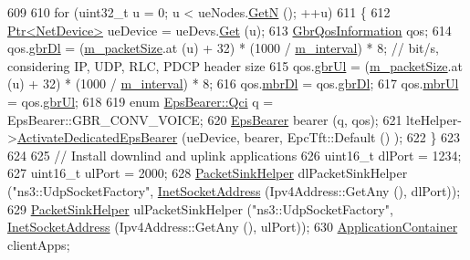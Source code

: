 \begin{DoxyCode}
609 
610   \textcolor{keywordflow}{for} (uint32\_t u = 0; u < ueNodes.\hyperlink{classns3_1_1NodeContainer_aed647ac56d0407a7706aba02eb44b951}{GetN} (); ++u)
611     \{
612       \hyperlink{classns3_1_1Ptr}{Ptr<NetDevice>} ueDevice = ueDevs.\hyperlink{classns3_1_1NetDeviceContainer_a677d62594b5c9d2dea155cc5045f4d0b}{Get} (u);
613       \hyperlink{structns3_1_1GbrQosInformation}{GbrQosInformation} qos;
614       qos.\hyperlink{structns3_1_1GbrQosInformation_a70b6106f5918d464d296bc23415ec801}{gbrDl} = (\hyperlink{classLenaCqaFfMacSchedulerTestCase2_ad46ead6ee3f29ac4d167b294e9fd7a7c}{m\_packetSize}.at (u) + 32) * (1000 / 
      \hyperlink{classLenaCqaFfMacSchedulerTestCase2_a682a0b8a7dee755e81395b515b0643e4}{m\_interval}) * 8;  \textcolor{comment}{// bit/s, considering IP, UDP, RLC, PDCP header size}
615       qos.\hyperlink{structns3_1_1GbrQosInformation_a8027f26c8fd5fd643d5af7a6a879860f}{gbrUl} = (\hyperlink{classLenaCqaFfMacSchedulerTestCase2_ad46ead6ee3f29ac4d167b294e9fd7a7c}{m\_packetSize}.at (u) + 32) * (1000 / 
      \hyperlink{classLenaCqaFfMacSchedulerTestCase2_a682a0b8a7dee755e81395b515b0643e4}{m\_interval}) * 8;
616       qos.\hyperlink{structns3_1_1GbrQosInformation_ac059dd3ad95475e8df63e52d9c2235e7}{mbrDl} = qos.\hyperlink{structns3_1_1GbrQosInformation_a70b6106f5918d464d296bc23415ec801}{gbrDl};
617       qos.\hyperlink{structns3_1_1GbrQosInformation_afce406e4f92771305075ace6cfe83e36}{mbrUl} = qos.\hyperlink{structns3_1_1GbrQosInformation_a8027f26c8fd5fd643d5af7a6a879860f}{gbrUl};
618   
619       \textcolor{keyword}{enum} \hyperlink{structns3_1_1EpsBearer_aecf0c67109c5eb4ec0b07226fff5885e}{EpsBearer::Qci} q = EpsBearer::GBR\_CONV\_VOICE;
620       \hyperlink{structns3_1_1EpsBearer}{EpsBearer} bearer (q, qos);
621       lteHelper->\hyperlink{classns3_1_1LteHelper_af28041edd4c96bde1a2e07c90e363dcc}{ActivateDedicatedEpsBearer} (ueDevice, bearer, EpcTft::Default ()
      );  
622     \}
623 
624 
625   \textcolor{comment}{// Install downlind and uplink applications}
626   uint16\_t dlPort = 1234;
627   uint16\_t ulPort = 2000;
628   \hyperlink{classns3_1_1PacketSinkHelper}{PacketSinkHelper} dlPacketSinkHelper (\textcolor{stringliteral}{"ns3::UdpSocketFactory"}, 
      \hyperlink{classns3_1_1InetSocketAddress}{InetSocketAddress} (Ipv4Address::GetAny (), dlPort));
629   \hyperlink{classns3_1_1PacketSinkHelper}{PacketSinkHelper} ulPacketSinkHelper (\textcolor{stringliteral}{"ns3::UdpSocketFactory"}, 
      \hyperlink{classns3_1_1InetSocketAddress}{InetSocketAddress} (Ipv4Address::GetAny (), ulPort));
630   \hyperlink{classns3_1_1ApplicationContainer}{ApplicationContainer} clientApps;

\end{DoxyCode}
